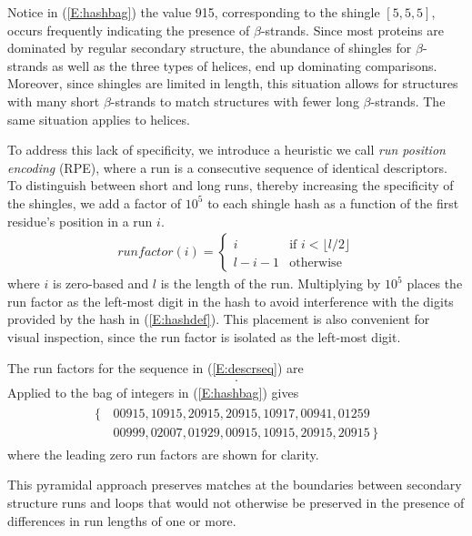 \documentclass[10pt,letterpaper]{article}
\begin{document}
Notice in (\ref{E:hashbag}) the value 915, corresponding to the shingle $[ 5, 5, 5 ]$, occurs frequently indicating the presence of $\beta$-strands. 
Since most proteins are dominated by regular secondary structure, the abundance of shingles for $\beta$-strands as well as the three types of helices, end up dominating comparisons. 
Moreover, since shingles are limited in length, this situation allows for structures with many short $\beta$-strands to match structures with fewer long $\beta$-strands.
The same situation applies to helices. 

To address this lack of specificity, we introduce a heuristic we call \emph{run position encoding} (RPE), where a run is a consecutive sequence of identical descriptors. 
To distinguish between short and long runs, thereby increasing the specificity of the shingles, we add a factor of $10^5$ to each shingle hash as a function of the first residue's position in a run $i$. 
\begin{gather}
    runfactor(i) = 
    \begin{cases}
        i               &\text{if $i < \lfloor l/2 \rfloor$}\\
        l - i - 1       &\text{otherwise} 
    \end{cases}
\end{gather}
where $i$ is zero-based and $l$ is the length of the run.
Multiplying by $10^5$ places the run factor as the left-most digit in the hash to avoid interference with the digits provided by the hash in (\ref{E:hashdef}).
This placement is also convenient for visual inspection, since the run factor is isolated as the left-most digit. 

The run factors for the sequence in (\ref{E:descrseq}) are
\begin{align}
    [\, 0, 1, 2, 2, 1, 0, 0, 0, 0, 0, 0, 1, 2, 2, 1, 0 \,].
\end{align}
Applied to the bag of integers in (\ref{E:hashbag}) gives
\begin{align}\label{E:rpebag}
    \begin{split}
    \{\,&00915, 10915, 20915, 20915, 10917, 00941, 01259 \\
        &00999, 02007, 01929, 00915, 10915, 20915, 20915 \,\}
    \end{split}
\end{align}
where the leading zero run factors are shown for clarity. 

This pyramidal approach preserves matches at the boundaries between secondary structure runs and loops that would not otherwise be preserved in the presence of differences in run lengths of one or more. 
\end{document}
